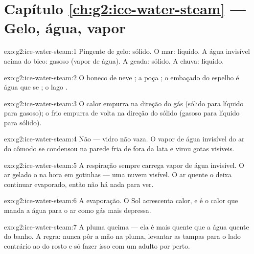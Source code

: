 \section*{Capítulo \ref{ch:g2:ice-water-steam} --- Gelo, água, vapor}

\begin{solution}{exo:g2:ice-water-steam:1}
Pingente de gelo: sólido. O mar: líquido. A água invisível acima do
bico: gasoso (vapor de água). A geada: sólido. A chuva: líquido.
\end{solution}

\begin{solution}{exo:g2:ice-water-steam:2}
O boneco de neve ; a poça ; o embaçado do espelho é
água que se ; o lago .
\end{solution}

\begin{solution}{exo:g2:ice-water-steam:3}
O calor empurra na direção do gás (sólido para líquido para gasoso);
o frio empurra de volta na direção do sólido (gasoso para líquido
para sólido).
\end{solution}

\begin{solution}{exo:g2:ice-water-steam:4}
Não --- vidro não vaza. O vapor de água invisível do ar do cômodo se
condensou na parede fria de fora da lata e virou gotas visíveis.
\end{solution}

\begin{solution}{exo:g2:ice-water-steam:5}
A respiração sempre carrega vapor de água invisível. O ar gelado o
 na hora em gotinhas --- uma nuvem visível. O ar quente o
deixa continuar evaporado, então não há nada para ver.
\end{solution}

\begin{solution}{exo:g2:ice-water-steam:6}
A evaporação. O Sol acrescenta calor, e é o calor que manda a água
para o ar como gás mais depressa.
\end{solution}

\begin{solution}{exo:g2:ice-water-steam:7}
A pluma queima --- ela é mais quente que a água quente do banho. A
regra: nunca pôr a mão na pluma, levantar as tampas para o lado
contrário ao do rosto e só fazer isso com um adulto por perto.
\end{solution}

